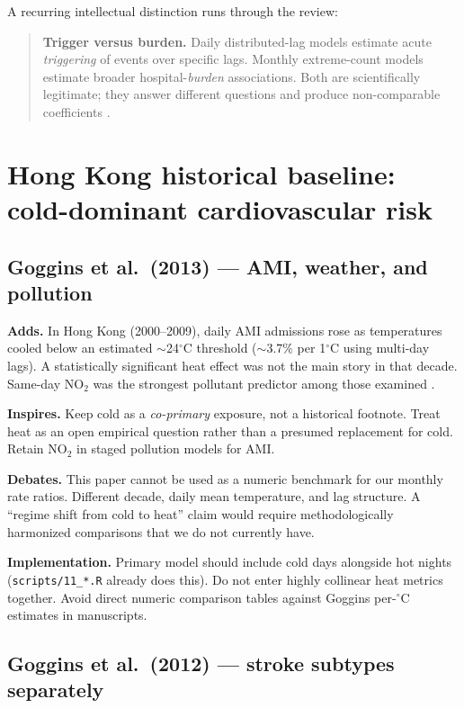 \documentclass[11pt]{article}
\newcommand{\adds}{\textcolor{green!40!black}{\textbf{Adds.}}}
\newcommand{\inspires}{\textcolor{blue!55!black}{\textbf{Inspires.}}}
\newcommand{\debates}{\textcolor{orange!70!black}{\textbf{Debates.}}}
\newcommand{\impl}{\textcolor{purple!55!black}{\textbf{Implementation.}}}
\begin{document}
A recurring intellectual distinction runs through the review:

\begin{quote}
\textbf{Trigger versus burden.} Daily distributed-lag models estimate acute
\emph{triggering} of events over specific lags. Monthly extreme-count models
estimate broader hospital-\emph{burden} associations. Both are scientifically
legitimate; they answer different questions and produce non-comparable
coefficients \citep{bhaskaran2013,gasparrini2010}.
\end{quote}

\section{Hong Kong historical baseline: cold-dominant cardiovascular risk}

\subsection{Goggins et al.\ (2013) --- AMI, weather, and pollution}

\adds{} In Hong Kong (2000--2009), daily AMI admissions rose as temperatures cooled
below an estimated $\sim$24$^\circ$C threshold ($\sim$3.7\% per 1$^\circ$C using
multi-day lags). A statistically significant heat effect was not the main story in
that decade. Same-day NO$_2$ was the strongest pollutant predictor among those
examined \citep{goggins2013}.

\inspires{} Keep cold as a \emph{co-primary} exposure, not a historical footnote.
Treat heat as an open empirical question rather than a presumed replacement for
cold. Retain NO$_2$ in staged pollution models for AMI.

\debates{} This paper cannot be used as a numeric benchmark for our monthly rate
ratios. Different decade, daily mean temperature, and lag structure. A ``regime
shift from cold to heat'' claim would require methodologically harmonized
comparisons that we do not currently have.

\impl{} Primary model should include cold days alongside hot nights
(\texttt{scripts/11\_*.R} already does this). Do not enter highly collinear heat
metrics together. Avoid direct numeric comparison tables against Goggins
per-$^\circ$C estimates in manuscripts.

\subsection{Goggins et al.\ (2012) --- stroke subtypes separately}
\end{document}

